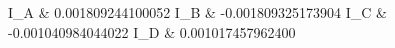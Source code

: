 I_A & 0.001809244100052 \hline 
I_B & -0.001809325173904 \hline 
I_C & -0.001040984044022 \hline 
I_D & 0.001017457962400 \hline 
